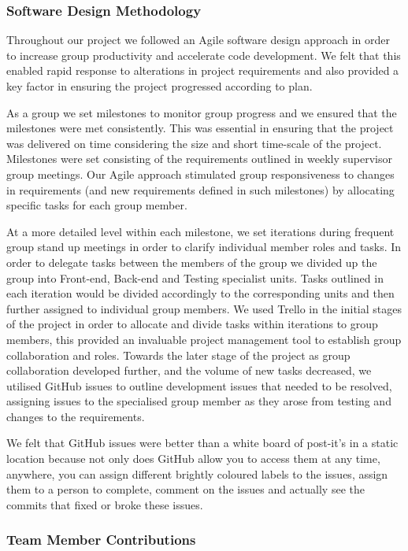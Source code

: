   \subsubsection{Software Design Methodology}
    Throughout our project we followed an Agile software design approach in order to increase group productivity and accelerate code development. We felt that this enabled rapid response to alterations in project requirements and also provided a key factor in ensuring the project progressed according to plan.

    As a group we set milestones to monitor group progress and we ensured that the milestones were met consistently. This was essential in ensuring that the project was delivered on time considering the size and short time-scale of the project. Milestones were set consisting of the requirements outlined in weekly supervisor group meetings. Our Agile approach stimulated group responsiveness to changes in requirements (and new requirements defined in such milestones) by allocating specific tasks for each group member.

    At a more detailed level within each milestone, we set iterations during frequent group stand up meetings in order to clarify individual member roles and tasks. In order to delegate tasks between the members of the group we divided up the group into Front-end, Back-end and Testing specialist units. Tasks outlined in each iteration would be divided accordingly to the corresponding units and then further assigned to individual group members. We used Trello in the initial stages of the project in order to allocate and divide tasks within iterations to group members, this provided an invaluable project management tool to establish group collaboration and roles. Towards the later stage of the project as group collaboration developed further, and the volume of new tasks decreased, we utilised GitHub issues to outline development issues that needed to be resolved, assigning issues to the specialised group member as they arose from testing and changes to the requirements.

    We felt that GitHub issues were better than a white board of post-it's in a static location because not only does GitHub allow you to access them at any time, anywhere, you can assign different brightly coloured labels to the issues, assign them to a person to complete, comment on the issues and actually see the commits that fixed or broke these issues.

  \subsubsection {Team Member Contributions}
